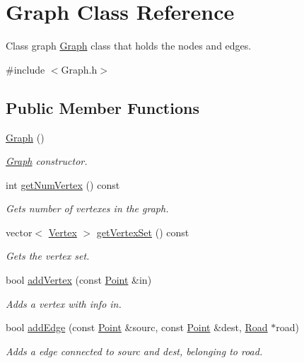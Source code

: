\hypertarget{class_graph}{}\section{Graph Class Reference}
\label{class_graph}


Class graph \hyperlink{class_graph}{Graph} class that holds the nodes and edges.  




{\ttfamily \#include $<$Graph.\+h$>$}

\subsection*{Public Member Functions}
\begin{DoxyCompactItemize}
\item 
\hyperlink{class_graph_ae4c72b8ac4d693c49800a4c7e273654f}{Graph} ()
\begin{DoxyCompactList}\small\item\em \hyperlink{class_graph}{Graph} constructor. \end{DoxyCompactList}\item 
int \hyperlink{class_graph_a74d463ee71d33c39b05602fbca6dbdbc}{get\+Num\+Vertex} () const 
\begin{DoxyCompactList}\small\item\em Gets number of vertexes in the graph. \end{DoxyCompactList}\item 
vector$<$ \hyperlink{class_vertex}{Vertex} $>$ \hyperlink{class_graph_aaf18b5cfd029a621c90a649f21ac0193}{get\+Vertex\+Set} () const 
\begin{DoxyCompactList}\small\item\em Gets the vertex set. \end{DoxyCompactList}\item 
bool \hyperlink{class_graph_a30f9bf4c9e309345269d798afea98741}{add\+Vertex} (const \hyperlink{class_point}{Point} \&in)
\begin{DoxyCompactList}\small\item\em Adds a vertex with info in. \end{DoxyCompactList}\item 
bool \hyperlink{class_graph_ab30449fbb88bf7169d01683a01eb0961}{add\+Edge} (const \hyperlink{class_point}{Point} \&sourc, const \hyperlink{class_point}{Point} \&dest, \hyperlink{class_road}{Road} $\ast$road)
\begin{DoxyCompactList}\small\item\em Adds a edge connected to sourc and dest, belonging to road. \end{DoxyCompactList}\item 

\end{DoxyCompactItemize}
